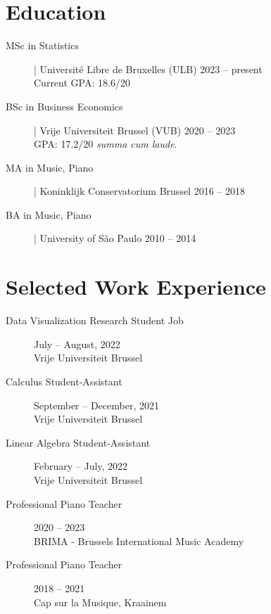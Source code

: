 \documentclass[11pt, a4paper, sans]{article}
\newcommand{\mycolor}{mySlateBlue}           %
\newcommand{\thesectionicon}{}
\newcommand{\sectionicon}[1]{\renewcommand{\thesectionicon}{#1}}
\newcommand{\adjust}{\vspace{-1.01ex}}
\begin{document}
\section{Education}
\begin{description}
\item[\textcolor{\mycolor}{MSc in Statistics}] | Université Libre de Bruxelles (ULB)
  \hfill 2023 -- present \\
  Current GPA: 18.6/20
  \adjust

\item[\textcolor{\mycolor}{BSc in Business Economics}] | Vrije Universiteit Brussel (VUB)
  \hfill  2020 -- 2023\\
  GPA: 17.2/20 \emph{summa cum laude}.
  \adjust

\item[\textcolor{\mycolor}{MA in Music, Piano}] | Koninklijk Conservatorium Brussel
  \hfill 2016 -- 2018\adjust

\item[\textcolor{\mycolor}{BA in Music, Piano}] | University of São Paulo
  \hfill 2010 -- 2014
\end{description} 
\sectionicon{\faToolbox}
\section{Selected Work Experience}
\begin{description}

\item[\textcolor{\mycolor}{Data Visualization Research Student Job}]
  \hfill July -- August, 2022\\
  Vrije Universiteit Brussel
  \adjust
  
\item[\textcolor{\mycolor}{Calculus Student-Assistant}]
  \hfill September -- December, 2021\\
  Vrije Universiteit Brussel
  \adjust

\item[\textcolor{\mycolor}{Linear Algebra Student-Assistant}]
  \hfill February -- July, 2022\\
  Vrije Universiteit Brussel
  \adjust

\item[\textcolor{\mycolor}{Professional Piano Teacher}] 
  \hfill 2020 -- 2023\\
  BRIMA - Brussels International Music Academy
  \adjust

\item[\textcolor{\mycolor}{Professional Piano Teacher}] 
  \hfill 2018 -- 2021\\
  Cap sur la Musique, Kraainem

\end{description}
\sectionicon{\faTools}
\end{document}
